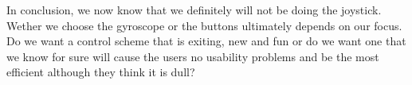 In conclusion, we now know that we definitely will not be doing the joystick. Wether we choose the gyroscope or the buttons ultimately depends on our focus. Do we want a control scheme that is exiting, new and fun or do we want one that we know for sure will cause the users no usability problems and be the most efficient although they think it is dull?


